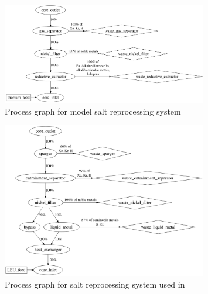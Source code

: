 \begin{figure}[htpb]
    \centering
    \includegraphics[width=0.8\textwidth]{figs/ch4/process_graph.png}
    \caption{Process graph for model salt reprocessing system}
    \label{fig:process-graph}
\end{figure}

\begin{figure}[htpb]
    \centering
    \includegraphics[width=0.8\textwidth]{figs/ch4/rykhlevskii_process_graph.png}
    \caption{Process graph for salt reprocessing system used in \cite{rykhlevskii_fuel_2020}}
    \label{fig:rykhlevskii-process-graph}
\end{figure}

